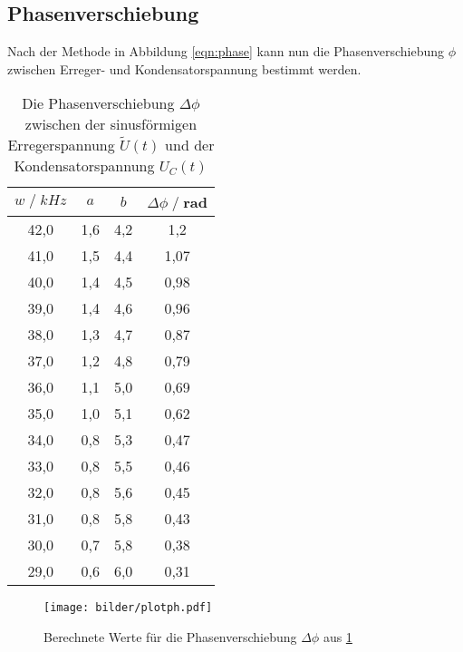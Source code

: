 \subsection{Phasenverschiebung}
Nach der Methode in Abbildung \ref{eqn:phase} kann nun die Phasenverschiebung $\phi$
zwischen Erreger- und Kondensatorspannung bestimmt werden. 
\begin{table}
    \centering
    \begin{tabular}{c c c c}
        \toprule
        $w\;/\;kHz$ & $a$ & $b$ & $\Delta \phi\;/\;$rad\\
        \midrule
        42,0 & 1,6 & 4,2 & 1,2 \\
        41,0 & 1,5 & 4,4 & 1,07 \\
        40,0 & 1,4 & 4,5 & 0,98 \\
        39,0 & 1,4 & 4,6 & 0,96 \\
        38,0 & 1,3 & 4,7 & 0,87 \\
        37,0 & 1,2 & 4,8 & 0,79 \\
        36,0 & 1,1 & 5,0 & 0,69 \\
        35,0 & 1,0 & 5,1 & 0,62 \\
        34,0 & 0,8 & 5,3 & 0,47 \\
        33,0 & 0,8 & 5,5 & 0,46 \\
        32,0 & 0,8 & 5,6 & 0,45 \\
        31,0 & 0,8 & 5,8 & 0,43 \\
        30,0 & 0,7 & 5,8 & 0,38 \\
        29,0 & 0,6 & 6,0 & 0,31 \\
        \bottomrule
    \end{tabular}
    \caption{Die Phasenverschiebung $\Delta \phi$ zwischen der sinusförmigen Erregerspannung $\tilde{U}(t)$ und der Kondensatorspannung $U_C(t)$}
    \label{tab:tabelle_phi}
\end{table}
\begin{figure}
    \centering
    \texttt{[image: bilder/plotph.pdf]}
    \caption{
        Berechnete Werte für die Phasenverschiebung $\Delta \phi$ aus \ref{tab:tabelle_phi} 
    }
\end{figure}





\label{sec:Auswertung}